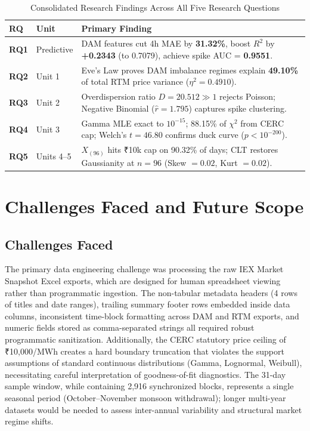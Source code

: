 \documentclass[12pt, a4paper]{article}
\theoremstyle{definition}
\begin{document}
\begin{table}[H]
\centering
\caption{Consolidated Research Findings Across All Five Research Questions}
\label{tab:results_summary}
\small
\begin{tabularx}{\textwidth}{>{\bfseries}l l X}
\toprule
\textbf{RQ} & \textbf{Unit} & \textbf{Primary Finding} \\
\midrule
RQ1 & Predictive & DAM features cut 4h MAE by \textbf{31.32\%}, boost $R^2$ by \textbf{+0.2343} (to 0.7079), achieve spike AUC = \textbf{0.9551}. \\
RQ2 & Unit 1 & Eve's Law proves DAM imbalance regimes explain \textbf{49.10\%} of total RTM price variance ($\eta^2 = 0.4910$). \\
RQ3 & Unit 2 & Overdispersion ratio $D = 20.512 \gg 1$ rejects Poisson; Negative Binomial ($\hat{r} = 1.795$) captures spike clustering. \\
RQ4 & Unit 3 & Gamma MLE exact to $10^{-15}$; 88.15\% of $\chi^2$ from CERC cap; Welch's $t = 46.80$ confirms duck curve ($p < 10^{-200}$). \\
RQ5 & Units 4--5 & $X_{(96)}$ hits ₹10k cap on 90.32\% of days; CLT restores Gaussianity at $n=96$ (Skew $= 0.02$, Kurt $= 0.02$). \\
\bottomrule
\end{tabularx}
\end{table}

\section{Challenges Faced and Future Scope}

\subsection{Challenges Faced}

The primary data engineering challenge was processing the raw IEX Market Snapshot Excel exports, which are designed for human spreadsheet viewing rather than programmatic ingestion. The non-tabular metadata headers (4 rows of titles and date ranges), trailing summary footer rows embedded inside data columns, inconsistent time-block formatting across DAM and RTM exports, and numeric fields stored as comma-separated strings all required robust programmatic sanitization. Additionally, the CERC statutory price ceiling of ₹10,000/MWh creates a hard boundary truncation that violates the support assumptions of standard continuous distributions (Gamma, Lognormal, Weibull), necessitating careful interpretation of goodness-of-fit diagnostics. The 31-day sample window, while containing 2,916 synchronized blocks, represents a single seasonal period (October--November monsoon withdrawal); longer multi-year datasets would be needed to assess inter-annual variability and structural market regime shifts.
\end{document}
